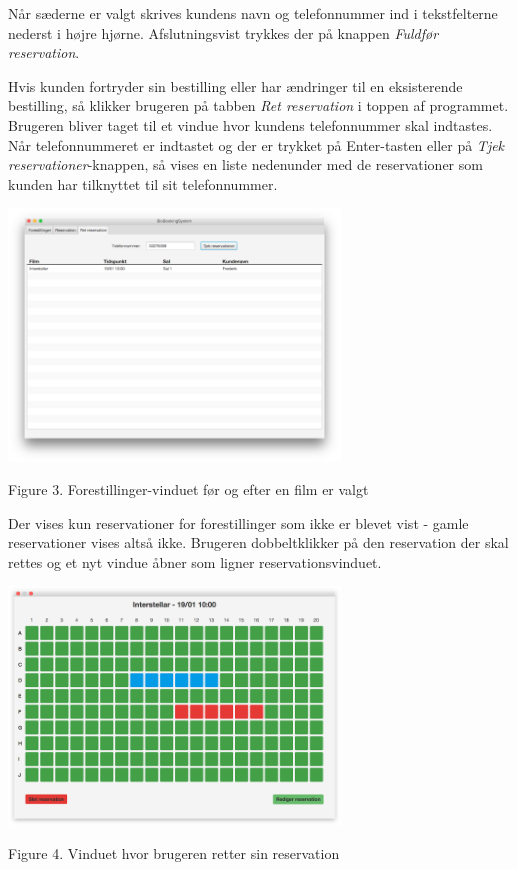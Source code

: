 \documentclass[final]{rapport1}
\begin{document}
Når sæderne er valgt skrives kundens navn og telefonnummer ind i tekstfelterne nederst i højre hjørne. Afslutningsvist trykkes der på knappen \emph{Fuldfør reservation}. 

Hvis kunden fortryder sin bestilling eller har ændringer til en eksisterende bestilling, så klikker brugeren på tabben \emph{Ret reservation} i toppen af programmet. Brugeren bliver taget til et vindue hvor kundens telefonnummer skal indtastes. Når telefonnummeret er indtastet og der er trykket på Enter-tasten eller på \emph{Tjek reservationer}-knappen, så vises en liste nedenunder med de reservationer som kunden har tilknyttet til sit telefonnummer. \\

\begin{picture}

\includegraphics[width=250pt]{4.png}

\end{picture}
\begin{center}
\tiny Figure 3. Forestillinger-vinduet før og efter en film er valgt
\end{center}

Der vises kun reservationer for forestillinger som ikke er blevet vist - gamle reservationer vises altså ikke. Brugeren dobbeltklikker på den reservation der skal rettes og et nyt vindue åbner som ligner reservationsvinduet. \\

\begin{picture}

\includegraphics[width=250pt]{5.png}

\end{picture}
\begin{center}
\tiny Figure 4. Vinduet hvor brugeren retter sin reservation
\end{center}
\end{document}

